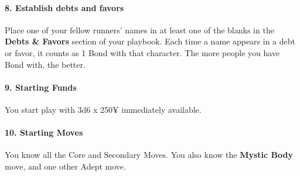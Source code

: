 \begin{multicols}{3}
\paragraph{8.  Establish debts and favors}

Place one of your fellow runners’ names in at
least one of the blanks in the \textbf{Debts \& Favors}
section of your playbook. Each time a name
appears in a debt or favor, it counts as 1 Bond
with that character. The more people you have
Bond with, the better.

\paragraph{9.  Starting Funds}

You start play with 3d6 x 250¥ immediately
available.

\paragraph{10.  Starting Moves}

You know all the Core and Secondary Moves.
You also know the \textbf{Mystic Body} move, and
one other Adept move.

\end{multicols}

\newpage

